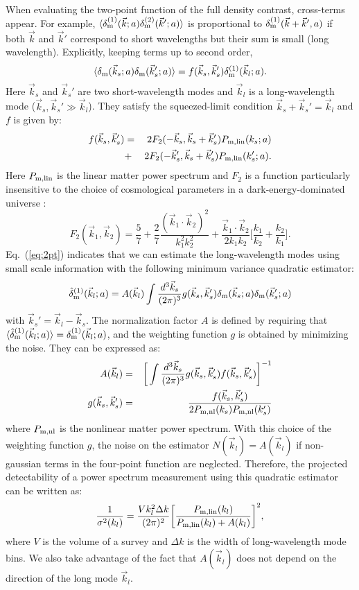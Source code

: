 \documentclass[prd,amsmath,amssymb,floatfix,superscriptaddress,nofootinbib,twocolumn]{revtex4-1}
\def\be{\begin{equation}}
\def\ee{\end{equation}}
\def\bea{\begin{eqnarray}}
\def\eea{\end{eqnarray}}
\newcommand{\vs}{\nonumber\\}
\newcommand{\vk}{\vec{k}}
\newcommand{\ec}[1]{Eq.~(\ref{eq:#1})}
\newcommand{\eql}[1]{\label{eq:#1}}
\begin{document}
When evaluating the two-point function of the full density contrast, cross-terms appear. For example, $\langle \delta_{\rm m}^{(1)}(\vk;a) \delta_{\rm m}^{(2)}(\vk';a) \rangle$ is proportional to $\delta^{(1)}_{\rm m}(\vk+\vk',a)$ if both $\vk$ and $\vk'$ correspond to short wavelengths but their sum is small (long wavelength). Explicitly, keeping terms up to second order, 
\be
\langle {\delta}_{\rm m}(\vec{k}_s;a){\delta}_{\rm m}(\vec{k}_s';a) \rangle =f(\vec{k}_s,\vec{k}_s'){\delta}^{(1)}_{\rm m}(\vec{k}_l;a). \eql{2pt}
\ee 
Here $\vk_s$ and $\vk_s'$ are two short-wavelength modes and $\vk_l$ is a long-wavelength mode ($\vk_s,\vk_s' \gg \vk_l$). They satisfy the squeezed-limit condition $\vk_s+\vk_s'=\vk_l$ and $f$ is given by:
\bea
f(\vec{k}_s,\vec{k}_s')&=&2F_2(-\vec{k}_s,\vec{k}_s+\vec{k}_s')P_{\rm m,lin}(k_s;a)\vs
&+&2F_2(-\vec{k}_s',\vec{k}_s+\vec{k}_s')P_{\rm m,lin}(k_s';a)       .
\eea 
Here $P_{\rm m,lin}$ is the linear matter power spectrum and $F_{2}$ is a function particularly insensitive to the choice of cosmological parameters in a dark-energy-dominated universe \cite{Takahashi:2008to}:
\be
F_{2}(\vk_1,\vk_2)=\frac{5}{7}+\frac{2}{7}\frac{(\vk_1\cdot \vk_2)^2}{k_1^2 k_2^2}+\frac{\vk_1\cdot \vk_2}{2k_1k_2}\bigg[\frac{k_1}{k_2}+\frac{k_2}{k_1}\bigg].\eql{f2}
\ee
\ec{2pt} indicates that we can estimate the long-wavelength modes using small scale information with the following minimum variance quadratic estimator:
\begin{eqnarray}
\hat{\delta}^{(1)}_{\rm m}(\vec{k}_l;a)=A(\vec{k}_l)\int \frac{d^3 \vec{k}_s}{(2\pi)^3} g(\vec{k}_s,\vec{k}_s'){\delta}_{\rm m}(\vec{k}_s;a){\delta}_{\rm m}(\vec{k}_s';a)\vs \eql{quadest}
\end{eqnarray} 
with $\vk_s'=\vk_l-\vk_s$. The normalization factor $A$ is defined by requiring that $\langle \hat{\delta}_{\rm m}^{(1)}(\vec{k}_l;a) \rangle={\delta}_{\rm m}^{(1)}(\vec{k}_l;a)$, and the weighting function $g$ is obtained by minimizing the noise. They can be expressed as:
\begin{eqnarray}
A(\vec{k}_l)&=&\bigg[\int \frac{d^3 \vec{k}_s}{(2\pi)^3} g(\vec{k}_s,\vec{k}_s')f(\vec{k}_s,\vec{k}_s')  \bigg]^{-1} \eql{a} \vs
g(\vec{k}_{s},\vec{k}_{s}')&=&\frac{f(\vec{k}_{s},\vec{k}_{s}')}{2P_{\rm m,nl}(k_{s})P_{\rm m,nl}(k_{s}')}
\end{eqnarray}
where $P_{\rm m,nl}$ is the nonlinear matter power spectrum. With this choice of the weighting function $g$, the noise on the estimator $N(\vk_l)=A(\vk_l)$ if non-gaussian terms in the four-point function are neglected. Therefore, the projected detectability of a power spectrum measurement using this quadratic estimator can be written as:
\be
\frac{1}{\sigma^{2}(k_l)}=\frac{V k_l^2 \Delta k }{(2\pi)^2}\bigg[\frac{P_{\rm m,lin}(k_l)}{P_{\rm m,lin}(k_l)+A(k_l) }\bigg]^2 \eql{error},
\ee
where $V$ is the volume of a survey and $\Delta k$ is the width of long-wavelength mode bins. We also take advantage of the fact that $A(\vk_l)$ does not depend on the direction of the long mode $\vk_l$.
\end{document}
